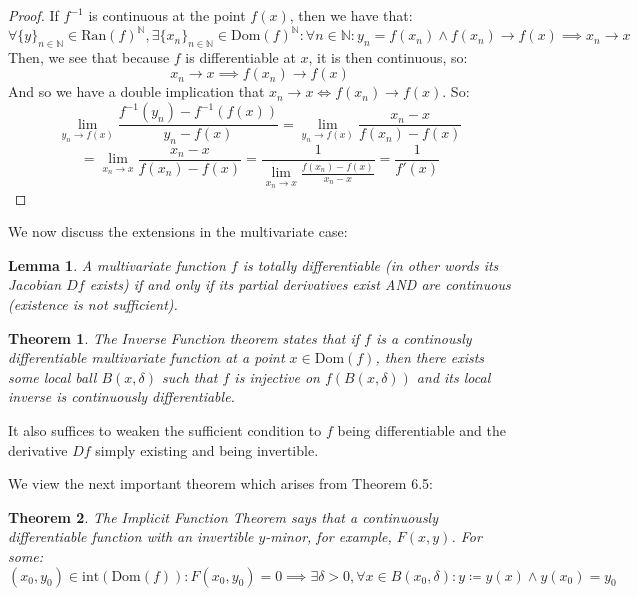\documentclass[10pt,letterpaper]{article} %
\newtheorem{thm}{Theorem}[section]
\newtheorem{lem}{Lemma}[section]
\begin{document}
\begin{proof}
If $f^{-1}$ is continuous at the point $f(x)$, then we have that:
\begin{equation*}
\forall \{y\}_{n \in \mathbb{N}} \in \text{Ran}(f)^\mathbb{N}, \exists \{x_n\}_{n \in \mathbb{N}} \in \text{Dom}(f)^\mathbb{N}: \forall n \in \mathbb{N}: y_n = f(x_n) \land f(x_n) \xrightarrow{} f(x) \implies x_n \xrightarrow{} x
\end{equation*}
Then, we see that because $f$ is differentiable at $x$, it is then continuous, so:
\begin{equation*}
x_n \xrightarrow{} x \implies f(x_n) \xrightarrow{} f(x)
\end{equation*}
And so we have a double implication that $x_n \xrightarrow{} x \iff f(x_n) \xrightarrow{} f(x)$. So:
\begin{equation*}
\lim_{y_n \xrightarrow{} f(x)}\frac{f^{-1}(y_n) - f^{-1}(f(x))}{y_n - f(x)} = \lim_{y_n \xrightarrow{} f(x)}\frac{x_n - x}{f(x_n) - f(x)}
\end{equation*}
\begin{equation*}
= \lim_{x_n \xrightarrow{} x}\frac{x_n - x}{f(x_n) - f(x)} = \frac{1}{\lim_{x_n \xrightarrow{} x}\frac{f(x_n) - f(x)}{x_n - x}} = \frac{1}{f'(x)} 
\end{equation*}
\end{proof}

We now discuss the extensions in the multivariate case:
\begin{lem}
A multivariate function $f$ is totally differentiable (in other words its Jacobian $Df$ exists) if and only if its partial derivatives exist AND are continuous (existence is not sufficient).
\end{lem}
\medskip
\begin{thm}
The Inverse Function theorem states that if $f$ is a continously differentiable multivariate function at a point $x \in \text{Dom}(f)$, then there exists some local ball $B(x, \delta)$ such that $f$ is injective on $f(B(x, \delta))$ and its local inverse is continuously differentiable.
\end{thm}
It also suffices to weaken the sufficient condition to $f$ being differentiable and the derivative $Df$ simply existing and being invertible.

\medskip
We view the next important theorem which arises from Theorem 6.5:
\begin{thm}
The Implicit Function Theorem says that a continuously differentiable function with an invertible $y$-minor, for example, $F(x, y)$. For some:
\begin{equation*}
  (x_0, y_0) \in \text{int}(\text{Dom}(f)): F(x_0, y_0) = 0 \implies \exists \delta > 0, \forall x \in B(x_0, \delta): y \coloneq y(x) \land y(x_0) = y_0
\end{equation*}
\end{thm}
\end{document}
